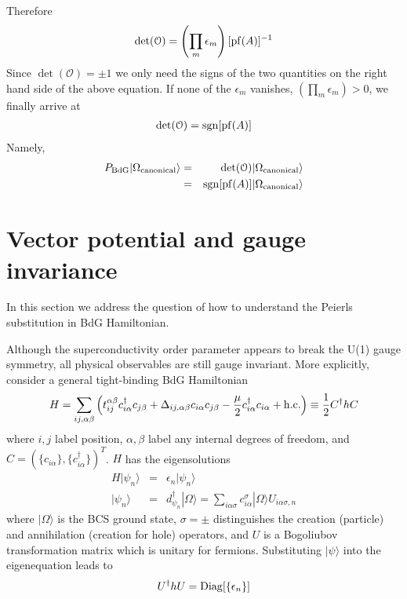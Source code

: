 Therefore
\begin{eqnarray}
	\det(\mathcal{O}) = \left(\prod_m \epsilon_m\right) [{\rm pf}(A)]^{-1}
\end{eqnarray}
Since $\det(\mathcal{O}) = \pm 1$ we only need the signs of the two quantities on the right hand side of the above equation. If none of the $\epsilon_m$ vanishes, $ \left(\prod_m \epsilon_m\right) > 0$, we finally arrive at
\begin{eqnarray}
	\det(\mathcal{O}) = {\rm sgn}[{\rm pf}(A)]
\end{eqnarray}
Namely,
\begin{eqnarray}
	P_{\rm BdG} |\Omega_{\rm canonical}\rangle &=& \det(\mathcal{O}) |\Omega_{\rm canonical}\rangle \\\nonumber
	&=& {\rm sgn}[{\rm pf}(A)]  |\Omega_{\rm canonical}\rangle
\end{eqnarray}

\newpage
\section{Vector potential and gauge invariance}
In this section we address the question of how to understand the Peierls substitution in BdG Hamiltonian.

Although the superconductivity order parameter appears to break the U(1) gauge symmetry, all physical observables are still gauge invariant. More explicitly, consider a general tight-binding BdG Hamiltonian
\begin{eqnarray}\label{eq:HBdGgeneral}
	H = \sum_{ij,\alpha\beta} \left(t_{ij}^{\alpha\beta}c_{i\alpha}^\dag c_{j\beta} + \Delta_{ij,\alpha\beta} c_{i\alpha}c_{j\beta} - \frac{\mu}{2}c_{i\alpha}^\dag c_{i\alpha} + {\rm h.c.} \right) \equiv \frac{1}{2}C^\dag h C
\end{eqnarray}
where $i,j$ label position, $\alpha,\beta$ label any internal degrees of freedom, and $C = (\{c_{i\alpha}\},\{c^\dag_{i\alpha}\})^T$. $H$ has the eigensolutions
\begin{eqnarray}
	H |\psi_n\rangle &=& \epsilon_n |\psi_n\rangle \\\nonumber
	|\psi_n\rangle &=& d^\dag_{\psi_n} |\Omega\rangle = \sum_{i\alpha\sigma}c^{\sigma}_{i\alpha} | \Omega\rangle U_{i\alpha\sigma,n}
\end{eqnarray}
where $|\Omega\rangle$ is the BCS ground state, $\sigma=\pm$ distinguishes the creation (particle) and annihilation (creation for hole) operators, and $U$ is a Bogoliubov transformation matrix which is unitary for fermions. Substituting $|\psi\rangle$ into the eigenequation leads to
\begin{eqnarray}
	U^\dag h U = {\rm Diag}[\{\epsilon_n\}]
\end{eqnarray}

